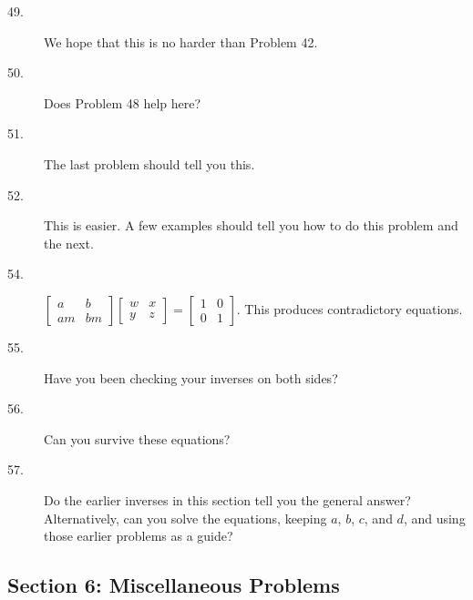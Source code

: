 \documentclass{article}
\begin{document}
\begin{description}
  \item[49.] We hope that this is no harder than Problem 42. 

  \item[50.] Does Problem 48 help here? 

  \item[51.] The last problem should tell you this. 

  \item[52.] This is easier. A few examples should tell you how to do this problem and the next. 

  \item[54.] $\begin{bmatrix} a & b \\ am & bm \end{bmatrix}  \begin{bmatrix} w & x \\ y & z \end{bmatrix}  =  \begin{bmatrix} 1 & 0 \\ 0 & 1 \end{bmatrix}$. This produces contradictory equations.

  \item[55.] Have you been checking your inverses on both sides? 

  \item[56.] Can you survive these equations? 

  \item[57.] Do the earlier inverses in this section tell you the general answer? Alternatively, can you solve the equations, keeping $a$, $b$, $c$, and $d$, and using those earlier problems as a guide?

\end{description}


\subsection*{Section 6: Miscellaneous Problems}
\end{document}
